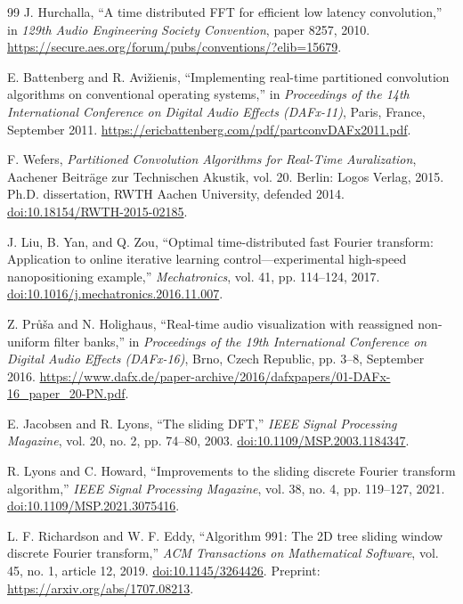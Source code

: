 \begin{thebibliography}{99}
J. Hurchalla, ``A time distributed FFT for efficient low latency convolution,''
in \emph{129th Audio Engineering Society Convention}, paper 8257, 2010.
\url{https://secure.aes.org/forum/pubs/conventions/?elib=15679}.

E. Battenberg and R. Avi\v{z}ienis, ``Implementing real-time partitioned
convolution algorithms on conventional operating systems,'' in
\emph{Proceedings of the 14th International Conference on Digital Audio
Effects (DAFx-11)}, Paris, France, September 2011.
\url{https://ericbattenberg.com/pdf/partconvDAFx2011.pdf}.

F. Wefers, \emph{Partitioned Convolution Algorithms for Real-Time Auralization},
Aachener Beitr\"age zur Technischen Akustik, vol. 20. Berlin: Logos Verlag, 2015.
Ph.D. dissertation, RWTH Aachen University, defended 2014.
\href{https://doi.org/10.18154/RWTH-2015-02185}{doi:10.18154/RWTH-2015-02185}.

J. Liu, B. Yan, and Q. Zou, ``Optimal time-distributed fast Fourier transform:
Application to online iterative learning control---experimental high-speed
nanopositioning example,'' \emph{Mechatronics}, vol. 41, pp. 114--124, 2017.
\href{https://doi.org/10.1016/j.mechatronics.2016.11.007}{doi:10.1016/j.mechatronics.2016.11.007}.

Z. Pr\r{u}\v{s}a and N. Holighaus, ``Real-time audio visualization with
reassigned non-uniform filter banks,'' in \emph{Proceedings of the 19th
International Conference on Digital Audio Effects (DAFx-16)}, Brno,
Czech Republic, pp. 3--8, September 2016.
\url{https://www.dafx.de/paper-archive/2016/dafxpapers/01-DAFx-16_paper_20-PN.pdf}.

E. Jacobsen and R. Lyons, ``The sliding DFT,'' \emph{IEEE Signal Processing
Magazine}, vol. 20, no. 2, pp. 74--80, 2003.
\href{https://doi.org/10.1109/MSP.2003.1184347}{doi:10.1109/MSP.2003.1184347}.

R. Lyons and C. Howard, ``Improvements to the sliding discrete Fourier
transform algorithm,'' \emph{IEEE Signal Processing Magazine}, vol. 38,
no. 4, pp. 119--127, 2021.
\href{https://doi.org/10.1109/MSP.2021.3075416}{doi:10.1109/MSP.2021.3075416}.

L. F. Richardson and W. F. Eddy, ``Algorithm 991: The 2D tree sliding window
discrete Fourier transform,'' \emph{ACM Transactions on Mathematical Software},
vol. 45, no. 1, article 12, 2019.
\href{https://doi.org/10.1145/3264426}{doi:10.1145/3264426}.
Preprint: \url{https://arxiv.org/abs/1707.08213}.


\end{thebibliography}
